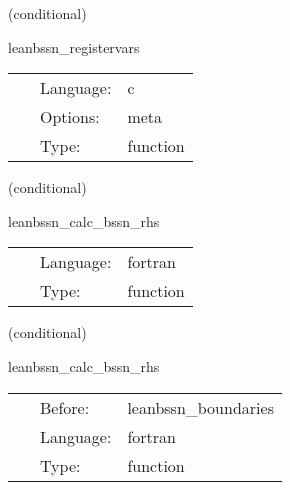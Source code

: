 \vspace{5mm}

   (conditional) 

\hspace{5mm} leanbssn\_registervars 

\hspace{5mm}{\it register variables for mol } 


\hspace{5mm}

 \begin{tabular*}{160mm}{cll} 
~ & Language:  & c \\ 
~ & Options:  & meta \\ 
~ & Type:  & function \\ 
\end{tabular*} 


\vspace{5mm}

   (conditional) 

\hspace{5mm} leanbssn\_calc\_bssn\_rhs 

\hspace{5mm}{\it mol rhs calculation } 


\hspace{5mm}

 \begin{tabular*}{160mm}{cll} 
~ & Language:  & fortran \\ 
~ & Type:  & function \\ 
\end{tabular*} 


\vspace{5mm}

   (conditional) 

\hspace{5mm} leanbssn\_calc\_bssn\_rhs 

\hspace{5mm}{\it mol rhs calculation } 


\hspace{5mm}

 \begin{tabular*}{160mm}{cll} 
~ & Before:  & leanbssn\_boundaries \\ 
~ & Language:  & fortran \\ 
~ & Type:  & function \\ 
\end{tabular*} 


